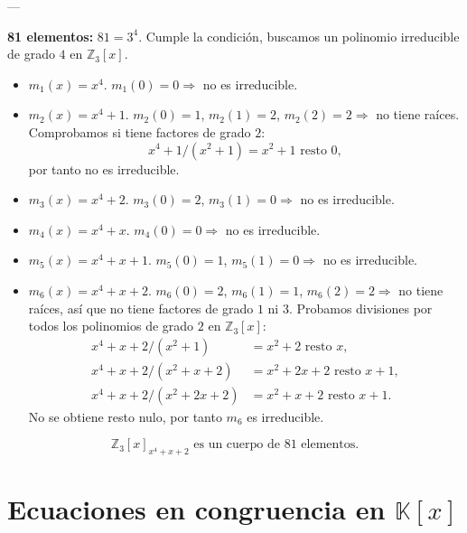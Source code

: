 \documentclass[a4paper,12pt]{article}
\begin{document}
\begin{ejercicio}[title=Ejercicio 60]
---

\textbf{81 elementos:}  
$81 = 3^4$. Cumple la condición, buscamos un polinomio irreducible de grado $4$ en $\mathbb{Z}_3[x]$.

\begin{itemize}
\item $m_1(x) = x^4$.  
$m_1(0) = 0 \Rightarrow$ no es irreducible.

\item $m_2(x) = x^4 + 1$.  
$m_2(0) = 1$, $m_2(1) = 2$, $m_2(2) = 2 \Rightarrow$ no tiene raíces.  
Comprobamos si tiene factores de grado $2$:
\[
x^4 + 1 / (x^2 + 1) = x^2 + 1 \text{ resto } 0,
\]
por tanto no es irreducible.
\end{itemize}

\end{ejercicio}
\begin{ejercicio}[title=Ejercicio 60]

\begin{itemize}
\item $m_3(x) = x^4 + 2$.  
$m_3(0) = 2$, $m_3(1) = 0 \Rightarrow$ no es irreducible.

\item $m_4(x) = x^4 + x$.  
$m_4(0) = 0 \Rightarrow$ no es irreducible.

\item $m_5(x) = x^4 + x + 1$.  
$m_5(0) = 1$, $m_5(1) = 0 \Rightarrow$ no es irreducible.

\item $m_6(x) = x^4 + x + 2$.  
$m_6(0) = 2$, $m_6(1) = 1$, $m_6(2) = 2 \Rightarrow$ no tiene raíces, así que no tiene factores de grado $1$ ni $3$.  
Probamos divisiones por todos los polinomios de grado $2$ en $\mathbb{Z}_3[x]$:
\[
\begin{aligned}
x^4 + x + 2 / (x^2 + 1) &= x^2 + 2 \text{ resto } x, \\
x^4 + x + 2 / (x^2 + x + 2) &= x^2 + 2x + 2 \text{ resto } x + 1, \\
x^4 + x + 2 / (x^2 + 2x + 2) &= x^2 + x + 2 \text{ resto } x + 1.
\end{aligned}
\]
No se obtiene resto nulo, por tanto $m_6$ es irreducible.
\end{itemize}
\[
\boxed{\mathbb{Z}_3[x]_{x^4 + x + 2} \text{ es un cuerpo de } 81 \text{ elementos.}}
\]
\end{ejercicio}


\section{Ecuaciones en congruencia en \(\mathbb{K}[x]\)}
\end{document}
